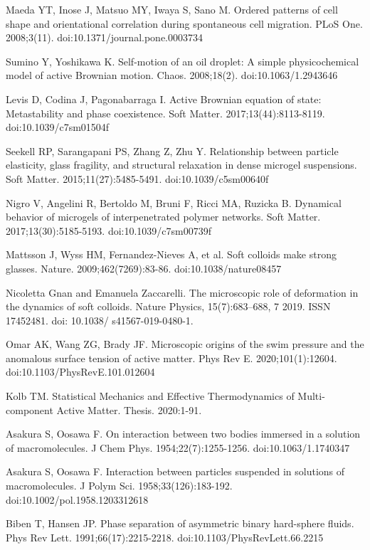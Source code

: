 \documentclass[11pt]{article}
\begin{document}
\begin{thebibliography}{9}
Maeda YT, Inose J, Matsuo MY, Iwaya S, Sano M. Ordered patterns of cell shape and orientational correlation during spontaneous cell migration. PLoS One. 2008;3(11). doi:10.1371/journal.pone.0003734

Sumino Y, Yoshikawa K. Self-motion of an oil droplet: A simple physicochemical model of active Brownian motion. Chaos. 2008;18(2). doi:10.1063/1.2943646

Levis D, Codina J, Pagonabarraga I. Active Brownian equation of state: Metastability and phase coexistence. Soft Matter. 2017;13(44):8113-8119. doi:10.1039/c7sm01504f

Seekell RP, Sarangapani PS, Zhang Z, Zhu Y. Relationship between particle elasticity, glass fragility, and structural relaxation in dense microgel suspensions. Soft Matter. 2015;11(27):5485-5491. doi:10.1039/c5sm00640f

Nigro V, Angelini R, Bertoldo M, Bruni F, Ricci MA, Ruzicka B. Dynamical behavior of microgels of interpenetrated polymer networks. Soft Matter. 2017;13(30):5185-5193. doi:10.1039/c7sm00739f

Mattsson J, Wyss HM, Fernandez-Nieves A, et al. Soft colloids make strong glasses. Nature. 2009;462(7269):83-86. doi:10.1038/nature08457

Nicoletta Gnan and Emanuela Zaccarelli. The microscopic role of deformation in the dynamics
of soft colloids. Nature Physics, 15(7):683–688, 7 2019. ISSN 17452481. doi: 10.1038/
s41567-019-0480-1.

Omar AK, Wang ZG, Brady JF. Microscopic origins of the swim pressure and the anomalous surface tension of active matter. Phys Rev E. 2020;101(1):12604. doi:10.1103/PhysRevE.101.012604

Kolb TM. Statistical Mechanics and Effective Thermodynamics of Multi-component Active Matter. Thesis. 2020:1-91.

Asakura S, Oosawa F. On interaction between two bodies immersed in a solution of macromolecules. J Chem Phys. 1954;22(7):1255-1256. doi:10.1063/1.1740347

Asakura S, Oosawa F. Interaction between particles suspended in solutions of macromolecules. J Polym Sci. 1958;33(126):183-192. doi:10.1002/pol.1958.1203312618

Biben T, Hansen JP. Phase separation of asymmetric binary hard-sphere fluids. Phys Rev Lett. 1991;66(17):2215-2218. doi:10.1103/PhysRevLett.66.2215


\end{thebibliography}
\end{document}
